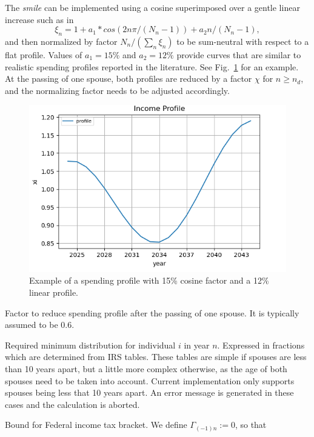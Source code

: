\documentclass{report}[fleqn,11pt]
\begin{document}
\begin{description}[leftmargin=4em,style=multiline]
	The {\em smile} can be implemented using a cosine superimposed over a gentle linear increase
	such as in
	\begin{equation}
		\xi_n = 1 + a_1*cos(2n\pi/(N_n-1)) + a_2n/(N_n-1),
	\end{equation}
	and then normalized by factor $N_n/(\sum_n \xi_n )$ to be sum-neutral with respect to a flat profile.
	Values of $a_1 = 15\%$ and $a_2=12\%$ provide curves that are similar to realistic
        spending profiles reported in the literature. See Fig.~\ref{Fig:profile} for an example.
	At the passing of one spouse, both profiles are reduced by a factor $\chi$ for $n \ge n_d$,
	and the normalizing factor needs to be adjusted accordingly.
	\begin{figure}[t]
	    \includegraphics{profile.png}
	    \caption{\small Example of a spending profile with 15\% cosine factor and a 12\% linear
	    profile. \label{Fig:profile}}
	\end{figure}
\item [$\chi$]
	Factor to reduce spending profile after the passing of one spouse. It is typically
	assumed to be 0.6.
\item [$\rho_{in}$]
	Required minimum distribution for individual $i$ in year $n$. Expressed in fractions
	which are determined from IRS tables. These tables are simple if spouses are less than 10 years apart,
	but a little more complex otherwise, as the age of both spouses need to be taken into account.
	Current implementation only supports spouses being less that 10 years apart.
	An error message is generated in these cases and the calculation is aborted.
\item [$\Gamma_{tn}$]
	Bound for Federal income tax bracket. We define $\Gamma_{(-1)n} := 0$, so that

\end{description}
\end{document}
